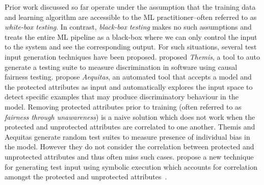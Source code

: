 \documentclass{article}
\begin{document}
Prior work discussed so far operate under the assumption that the
training data and learning algorithm are accessible to the ML
practitioner--often referred to as \emph{white-box testing}. In
contrast, \emph{black-box testing} makes no such assumptions and
treats the entire ML pipeline as a black-box where we can only control
the input to the system and see the corresponding output. For such
situations, several test input generation techniques have been
proposed. \citeauthor{galhotra2017fairness} proposed \emph{Themis}, a
tool to auto generate a testing suite to measure discrimination in
software using causal fairness testing.
\citeauthor{udeshi2018automated} propose \emph{Aequitas}, an automated
tool that accepts a model and the protected attributes as input and
automatically explores the input space to detect specific examples
that may produce discriminatory behaviour in the model. Removing
protected attributes prior to training (often referred to as
\emph{fairness through unawareness}) is a naive solution which does
not work when the protected and unprotected attributes are correlated
to one another. Themis and Aequitas generate random test suites to
measure presence of individual bias in the model. However they do not
consider the correlation between protected and unprotected attributes
and thus often miss such cases. \citeauthor{aggarwal2019black} propose
a new technique for generating test input using symbolic execution
which accounts for correlation amongst the protected and unprotected
attributes \cite{aggarwal2019black,udeshi2018automated,galhotra2017fairness}.






\end{document}
